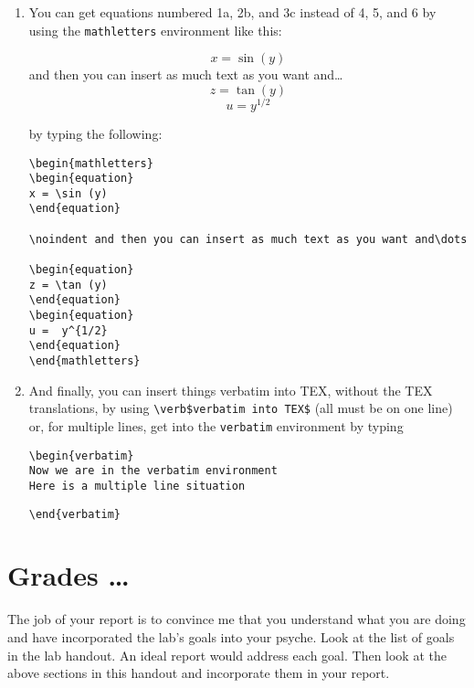 \documentclass[12pt,preprint]{aastex}
\begin{document}
\begin{enumerate}
\item You can get equations numbered 1a, 2b, and 3c instead of 4, 5,
and 6 by using the \verb$mathletters$ environment like this:
\begin{mathletters}
\begin{equation}
x = \sin (y)
\end{equation}
\noindent and then you can insert as much text as you want and\dots
\begin{equation}
z = \tan (y)
\end{equation}
\begin{equation}
u =  y^{1/2}
\end{equation}
\end{mathletters}
by typing the following:
\begin{verbatim}
\begin{mathletters}
\begin{equation}
x = \sin (y)
\end{equation}

\noindent and then you can insert as much text as you want and\dots

\begin{equation}
z = \tan (y)
\end{equation}
\begin{equation}
u =  y^{1/2}
\end{equation}
\end{mathletters}
\end{verbatim}

\item And finally, you can insert things verbatim into TEX, without the
TEX translations, by using \verb=\verb$verbatim into TEX$= (all must be
on one line) or, for multiple lines, get into the \verb$verbatim$
environment by typing

\begin{verbatim}
\begin{verbatim}
Now we are in the verbatim environment
Here is a multiple line situation
\end{verbatim}
\verb$\end{verbatim}$
\end{enumerate}

\section{Grades \dots}

\noindent
 The job of your report is to convince me that you understand
 what you are doing and have incorporated the lab's goals into your
 psyche.  Look at the list of goals in the lab handout. An ideal
 report would address each goal. Then look at the above sections in this
 handout and incorporate them in your report.
\end{document}
